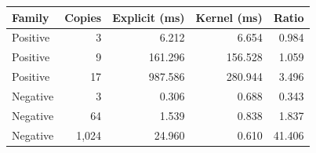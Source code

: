 \begin{center}
\begin{tabular}{lrrrr}
\toprule
Family & Copies & Explicit (ms) & Kernel (ms) & Ratio\\
\midrule
Positive & 3 & 6.212 & 6.654 & 0.984\\
Positive & 9 & 161.296 & 156.528 & 1.059\\
Positive & 17 & 987.586 & 280.944 & 3.496\\
Negative & 3 & 0.306 & 0.688 & 0.343\\
Negative & 64 & 1.539 & 0.838 & 1.837\\
Negative & 1,024 & 24.960 & 0.610 & 41.406\\
\bottomrule
\end{tabular}
\end{center}
